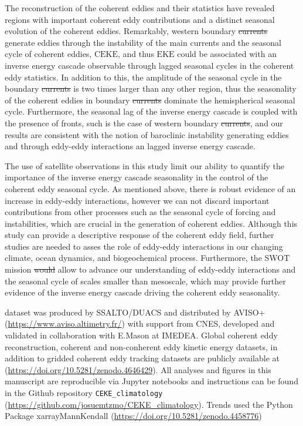 \documentclass[draft,linenumbers]{agujournal2019}
\newcommand{\EKE}{\textrm{EKE}}
\newcommand{\CEKE}{\textrm{CEKE}}
\providecommand{\DIFadd}[1]{{\protect\color{blue}\uwave{#1}}} %
\providecommand{\DIFdel}[1]{{\protect\color{red}\sout{#1}}}                      %
\providecommand{\DIFaddbegin}{} %
\providecommand{\DIFaddend}{} %
\providecommand{\DIFdelbegin}{} %
\providecommand{\DIFdelend}{} %
\begin{document}
	The reconstruction of the coherent eddies and their statistics have revealed regions with important coherent eddy contributions and a distinct seasonal evolution of the coherent eddies. 
	Remarkably, western boundary \DIFdelbegin \DIFdel{currents }\DIFdelend \DIFaddbegin \DIFadd{extensions }\DIFaddend generate eddies through the instability of the main currents and the seasonal cycle of coherent eddies, $\CEKE$, and thus $\EKE$ could be associated with an inverse energy cascade observable through lagged seasonal cycles in the coherent eddy statistics. 
	In addition to this, the amplitude of the seasonal cycle in the boundary \DIFdelbegin \DIFdel{currents }\DIFdelend \DIFaddbegin \DIFadd{extensions }\DIFaddend is two times larger than any other region, thus the seasonality of the coherent eddies in boundary \DIFdelbegin \DIFdel{currents }\DIFdelend \DIFaddbegin \DIFadd{extensions }\DIFaddend dominate the hemispherical seasonal cycle. 
	Furthermore, the seasonal lag of the inverse energy cascade is coupled with the presence of fronts, such is the case of western boundary \DIFdelbegin \DIFdel{currents}\DIFdelend \DIFaddbegin \DIFadd{extensions}\DIFaddend , and our results are consistent with the notion of baroclinic instability generating eddies and through eddy-eddy interactions an lagged inverse energy cascade.

	The use of satellite observations in this study limit our ability to quantify the importance of the inverse energy cascade seasonality in the control of the coherent eddy seasonal cycle. 
	As mentioned above, there is robust evidence of an increase in eddy-eddy interactions, however we can not discard important contributions from other processes such as the seasonal cycle of forcing and instabilities, which are crucial in the generation of coherent eddies. Although this study can provide a descriptive response of the coherent eddy field, further studies are needed to asses the role of eddy-eddy interactions in our changing climate, ocean dynamics, and biogeochemical process. Furthermore, the SWOT mission \DIFdelbegin \DIFdel{would }\DIFdelend \DIFaddbegin \DIFadd{could }\DIFaddend allow to advance our understanding of eddy-eddy interactions and the seasonal cycle of scales smaller than mesoscale, which may provide further evidence of the inverse energy cascade driving the coherent eddy seasonality.

	\acknowledgments
	\citet{Chelton_mesoscale_2013} dataset was produced by SSALTO/DUACS and distributed by AVISO+ (\url{https://www.aviso.altimetry.fr/}) with support from CNES, developed and validated in collaboration with E.Mason at IMEDEA.
	Global coherent eddy reconstruction, coherent and non-conherent eddy kinetic energy datasets, in addition to gridded coherent eddy tracking datasets are publicly available at (\url{https://doi.org/10.5281/zenodo.4646429}). 
	All analyses and figures in this manuscript are reproducible via Jupyter notebooks and instructions can be found in the Github repository \texttt{CEKE\_climatology} (\url{https://github.com/josuemtzmo/CEKE_climatology}). Trends used the Python Package xarrayMannKendall (\url{https://doi.org/10.5281/zenodo.4458776})

	
\end{document}
